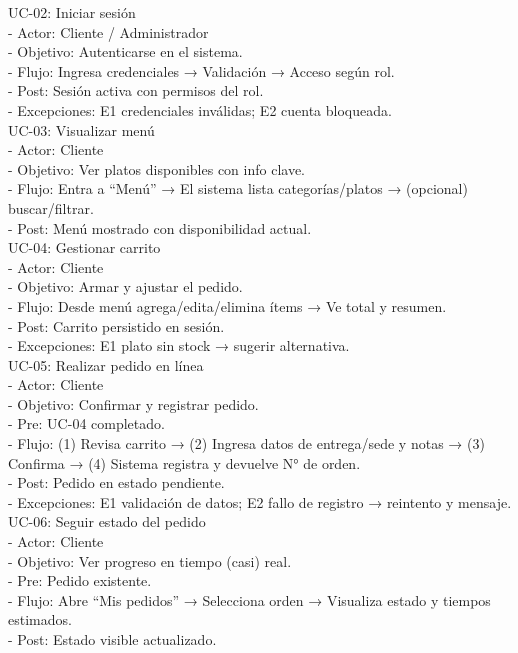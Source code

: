 \documentclass{article}
\begin{document}
\begin{doublespace}
    UC-02: Iniciar sesión\\
    - Actor: Cliente / Administrador\\
    - Objetivo: Autenticarse en el sistema.\\
    - Flujo: Ingresa credenciales → Validación → Acceso según rol.\\
    - Post: Sesión activa con permisos del rol.\\
    - Excepciones: E1 credenciales inválidas; E2 cuenta bloqueada.\\
    
    UC-03: Visualizar menú\\
    - Actor: Cliente\\
    - Objetivo: Ver platos disponibles con info clave.\\
    - Flujo: Entra a “Menú” → El sistema lista categorías/platos → (opcional) buscar/filtrar.\\
    - Post: Menú mostrado con disponibilidad actual.\\
    
    UC-04: Gestionar carrito\\
    - Actor: Cliente\\
    - Objetivo: Armar y ajustar el pedido.\\
    - Flujo: Desde menú agrega/edita/elimina ítems → Ve total y resumen.\\
    - Post: Carrito persistido en sesión.\\
    - Excepciones: E1 plato sin stock → sugerir alternativa.\\

    UC-05: Realizar pedido en línea\\
    - Actor: Cliente\\
    - Objetivo: Confirmar y registrar pedido.\\
    - Pre: UC-04 completado.\\
    - Flujo: (1) Revisa carrito → (2) Ingresa datos de entrega/sede y notas → (3) Confirma → (4) Sistema registra y devuelve N° de orden.\\
    - Post: Pedido en estado pendiente.\\
    - Excepciones: E1 validación de datos; E2 fallo de registro → reintento y mensaje.\\
    
    UC-06: Seguir estado del pedido\\
    - Actor: Cliente\\
    - Objetivo: Ver progreso en tiempo (casi) real.\\
    - Pre: Pedido existente.\\
    - Flujo: Abre “Mis pedidos” → Selecciona orden → Visualiza estado y tiempos estimados.\\
    - Post: Estado visible actualizado.\\


\end{doublespace}
\end{document}
